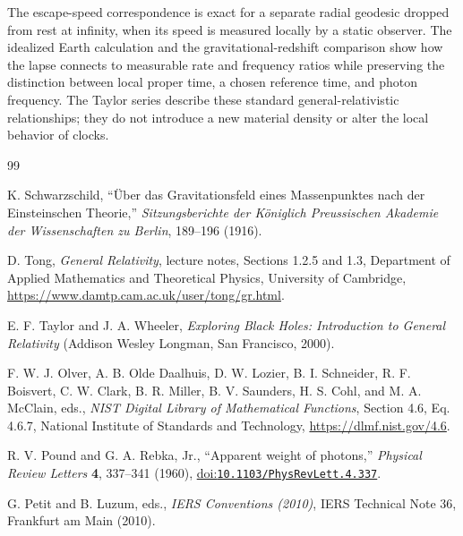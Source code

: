 \documentclass[12pt]{article}
\begin{document}
The escape-speed correspondence is exact for a separate radial geodesic dropped from rest at infinity, when its speed is measured locally by a static observer. The idealized Earth calculation and the gravitational-redshift comparison show how the lapse connects to measurable rate and frequency ratios while preserving the distinction between local proper time, a chosen reference time, and photon frequency. The Taylor series describe these standard general-relativistic relationships; they do not introduce a new material density or alter the local behavior of clocks.

\clearpage
\begin{thebibliography}{99}
\small
{}
\raggedright
{}

K. Schwarzschild,
``\"Uber das Gravitationsfeld eines Massenpunktes nach der Einsteinschen Theorie,''
\emph{Sitzungsberichte der K\"oniglich Preussischen Akademie der Wissenschaften zu Berlin}, 189--196 (1916).

D. Tong,
\emph{General Relativity}, lecture notes, Sections 1.2.5 and 1.3, Department of Applied Mathematics and Theoretical Physics, University of Cambridge,
\url{https://www.damtp.cam.ac.uk/user/tong/gr.html}.

E. F. Taylor and J. A. Wheeler,
\emph{Exploring Black Holes: Introduction to General Relativity}
(Addison Wesley Longman, San Francisco, 2000).

F. W. J. Olver, A. B. Olde Daalhuis, D. W. Lozier, B. I. Schneider, R. F. Boisvert, C. W. Clark, B. R. Miller, B. V. Saunders, H. S. Cohl, and M. A. McClain, eds.,
\emph{NIST Digital Library of Mathematical Functions}, Section 4.6, Eq. 4.6.7, National Institute of Standards and Technology,
\url{https://dlmf.nist.gov/4.6}.

R. V. Pound and G. A. Rebka, Jr.,
``Apparent weight of photons,''
\emph{Physical Review Letters} \textbf{4}, 337--341 (1960),
\href{https://doi.org/10.1103/PhysRevLett.4.337}{doi:\nolinkurl{10.1103/PhysRevLett.4.337}}.

G. Petit and B. Luzum, eds.,
\emph{IERS Conventions (2010)}, IERS Technical Note 36, Frankfurt am Main (2010).

\end{thebibliography}
\end{document}
